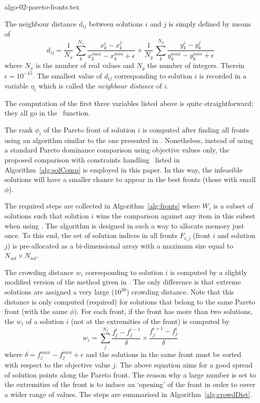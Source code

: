 \documentclass[final,5p,times,twocolumn]{elsarticle}
\begin{document}
{algo-02-pareto-fronts.tex}


The neighbour distance $d_{ij}$ between solutions $i$ and $j$ is simply defined by means of
\begin{equation}
    d_{ij} = \frac{1}{N_x} \, \sum_k^{N_x} \frac{x_k^i - x_k^j}{x^{max}_k - x^{min}_k + \epsilon}
           + \frac{1}{N_y} \, \sum_k^{N_y} \frac{y_k^i - y_k^j}{y^{max}_k - y^{min}_k + \epsilon}
\end{equation}
where $N_x$ is the number of real values and $N_y$ the number of integers. Therein ${\epsilon =
10^{-15}}$. The smallest value of $d_{ij}$ corresponding to solution $i$ is recorded in a variable
$\eta_i$ which is called the \emph{neighbour distance} of $i$.

The computation of the first three variables listed above is quite straightforward; they all go in
the \FnMetrics~function.

The rank $\phi_i$ of the Pareto front of solution $i$ is computed after finding all fronts using an
algorithm similar to the one presented in \citep{deb:02}. Nonetheless, instead of using a standard
Pareto dominance comparison using objective values only, the proposed comparison with constraints
handling \FnCompareSolutions~listed in Algorithm~\ref{alg:solComp} is employed in this paper. In
this way, the infeasible solutions will have a smaller chance to appear in the best fronts (those
with small $\phi$).

The required steps are collected in Algorithm~\ref{alg:fronts} where $W_i$ is a subset of solutions
such that solution $i$ wins the comparison against any item in this subset when using
\FnCompareSolutions. The algorithm is designed in such a way to allocate memory just once. To this
end, the set of solution indices in all fronts $F_{i,j}$ (front $i$ and solution $j$) is
pre-allocated as a bi-dimensional array with a maximum size equal to ${N_{sol} \times N_{sol}}$.

The crowding distance $w_i$ corresponding to solution $i$ is computed by a slightly modified version
of the method given in \citep{tiwari:11}. The only difference is that extreme solutions are assigned
a very large ($10^{30}$) crowding distance. Note that this distance is only computed (required) for
solutions that belong to the same Pareto front (with the same $\phi$). For each front, if the front
has more than two solutions, the $w_i$ of a solution $i$ (not at the extremities of the front) is
computed by
\begin{equation}
    w_i = \sum_j^{N_f} \frac{f^i_j - f^{i-1}_j}{\delta} \times \frac{f^{i+1}_j - f^i_j}{\delta}
\end{equation}
where ${\delta = f^{max}_j - f^{min}_j + \epsilon}$ and the solutions in the same front must be
sorted with respect to the objective value $j$. The above equation aims for a good spread of
solution points along the Pareto front. The reason why a large number is set to the extremities of
the front is to induce an `opening' of the front in order to cover a wider range of values. The
steps are summarised in Algorithm~\ref{alg:crowdDist}.
\end{document}

